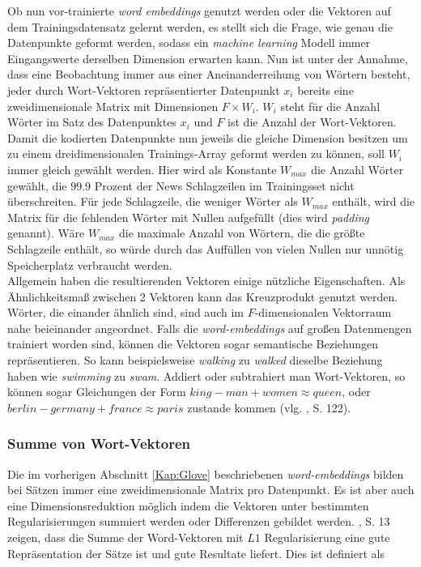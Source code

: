 \documentclass[a4paper,11pt]{article}
\begin{document}
Ob nun vor-trainierte \textit{word embeddings} genutzt werden oder die Vektoren auf dem Trainingsdatensatz gelernt werden, es stellt sich die Frage, wie genau die Datenpunkte geformt werden, sodass ein \textit{machine learning} Modell immer Eingangswerte derselben Dimension erwarten kann. Nun ist unter der Annahme, dass eine Beobachtung immer aus einer Aneinanderreihung von Wörtern besteht, jeder durch Wort-Vektoren repräsentierter Datenpunkt $x_i$ bereits eine zweidimensionale Matrix mit Dimensionen $F \times  W_i$. $W_i$ steht für die Anzahl Wörter im Satz des Datenpunktes $x_i$ und $F$ ist die Anzahl der Wort-Vektoren. Damit die kodierten Datenpunkte nun jeweils die gleiche Dimension besitzen um zu einem dreidimensionalen Trainings-Array geformt werden zu können, soll $W_i$ immer gleich gewählt werden. Hier wird als Konstante $W_{max}$ die Anzahl Wörter gewählt, die $99.9$ Prozent der News Schlagzeilen im Trainingsset nicht überschreiten. Für jede Schlagzeile, die weniger Wörter als $W_{max}$ enthält, wird die Matrix für die fehlenden Wörter mit Nullen aufgefüllt (dies wird \textit{padding} genannt). Wäre $W_{max}$ die maximale Anzahl von Wörtern, die die größte Schlagzeile enthält, so würde durch das Auffüllen von vielen Nullen nur unnötig Speicherplatz verbraucht werden. \\

Allgemein haben die resultierenden Vektoren einige nützliche Eigenschaften. Als Ähnlichkeits\-maß zwischen 2 Vektoren kann das Kreuzprodukt genutzt werden. Wörter, die einander ähnlich sind, sind auch im $F$-dimensionalen Vektorraum nahe beieinander angeordnet. Falls die \textit{word-embeddings} auf großen Datenmengen trainiert worden sind, können die Vektoren sogar semantische Beziehungen repräsentieren. So kann beispielsweise \textit{walking} zu \textit{walked} dieselbe Beziehung haben wie \textit{swimming} zu \textit{swam}. Addiert oder subtrahiert man Wort-Vektoren, so können sogar Gleichungen der Form $king - man + women \approx queen$, oder $berlin - germany + france \approx paris$ zustande kommen (vlg. \cite{deepEssentials}, S. 122).

\subsubsection{Summe von Wort-Vektoren}

Die im vorherigen Abschnitt \ref{Kap:Glove} beschriebenen \textit{word-embeddings} bilden bei Sätzen immer eine zweidimensionale Matrix pro Datenpunkt. Es ist aber auch eine Dimensionsreduktion möglich indem die Vektoren unter bestimmten Regularisierungen summiert werden oder Differenzen gebildet werden. \cite{sumsWords}, S. 13 zeigen, dass die Summe der Word-Vektoren mit $L1$ Regularisierung eine gute Repräsentation der Sätze ist und gute Resultate liefert. Dies ist definiert als
\end{document}
